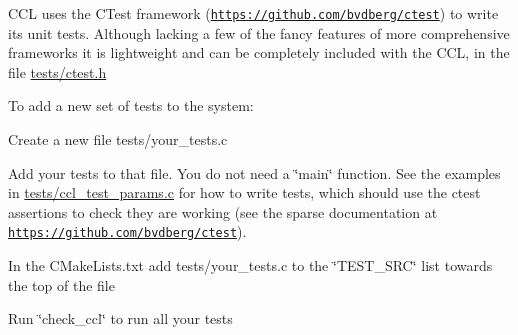 C\+CL uses the C\+Test framework (\href{https://github.com/bvdberg/ctest}{\tt https\+://github.\+com/bvdberg/ctest}) to write its unit tests. Although lacking a few of the fancy features of more comprehensive frameworks it is lightweight and can be completely included with the C\+CL, in the file \mbox{\hyperlink{ctest_8h}{tests/ctest.\+h}}

To add a new set of tests to the system\+:


\begin{DoxyItemize}
\item Create a new file tests/your\+\_\+tests.\+c
\item Add your tests to that file. You do not need a \char`\"{}main\char`\"{} function. See the examples in \mbox{\hyperlink{ccl__test__params_8c}{tests/ccl\+\_\+test\+\_\+params.\+c}} for how to write tests, which should use the ctest assertions to check they are working (see the sparse documentation at \href{https://github.com/bvdberg/ctest}{\tt https\+://github.\+com/bvdberg/ctest}).
\item In the C\+Make\+Lists.\+txt add tests/your\+\_\+tests.\+c to the \char`\"{}\+T\+E\+S\+T\+\_\+\+S\+R\+C\char`\"{} list towards the top of the file
\item Run \char`\"{}check\+\_\+ccl\char`\"{} to run all your tests 
\end{DoxyItemize}